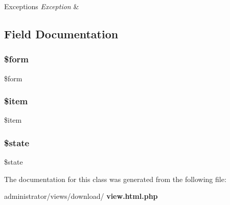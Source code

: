 \begin{DoxyExceptions}{Exceptions}
{\em Exception} & \\
\hline
\end{DoxyExceptions}


\subsection{Field Documentation}
\mbox{\label{classtks__agenda_view_download_a1a4fda4c28a9ee5f91102c023b9501f4}} 
\subsubsection{\$form}
{\footnotesize\ttfamily \$form\hspace{0.3cm}{\ttfamily [protected]}}

\mbox{\label{classtks__agenda_view_download_aa61b415cee119a7511e05c405ecd0b32}} 
\subsubsection{\$item}
{\footnotesize\ttfamily \$item\hspace{0.3cm}{\ttfamily [protected]}}

\mbox{\label{classtks__agenda_view_download_ae82306c4f2d17d8dd5c7d8d916b33bed}} 
\subsubsection{\$state}
{\footnotesize\ttfamily \$state\hspace{0.3cm}{\ttfamily [protected]}}



The documentation for this class was generated from the following file\+:\begin{DoxyCompactItemize}
\item 
administrator/views/download/\textbf{ view.\+html.\+php}\end{DoxyCompactItemize}
